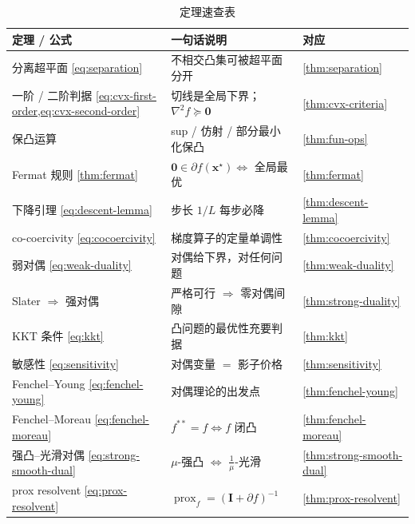 \begin{table}[H]\centering\small
\caption{定理速查表}
\label{tab:cvx-theorems}
\begin{tabular}{lll}
\toprule
定理 / 公式 & 一句话说明 & 对应 \\
\midrule
分离超平面 \cref{eq:separation} & 不相交凸集可被超平面分开 & \cref{thm:separation} \\
一阶 / 二阶判据 \cref{eq:cvx-first-order,eq:cvx-second-order} & 切线是全局下界；$\nabla^2 f\succeq\mathbf 0$ & \cref{thm:cvx-criteria} \\
保凸运算 & sup / 仿射 / 部分最小化保凸 & \cref{thm:fun-ops} \\
Fermat 规则 \cref{thm:fermat} & $\mathbf 0\in\partial f(\mathbf x^\star)\iff$ 全局最优 & \cref{thm:fermat} \\
下降引理 \cref{eq:descent-lemma} & 步长 $1/L$ 每步必降 & \cref{thm:descent-lemma} \\
co-coercivity \cref{eq:cocoercivity} & 梯度算子的定量单调性 & \cref{thm:cocoercivity} \\
弱对偶 \cref{eq:weak-duality} & 对偶给下界，对任何问题 & \cref{thm:weak-duality} \\
Slater $\Rightarrow$ 强对偶 & 严格可行 $\Rightarrow$ 零对偶间隙 & \cref{thm:strong-duality} \\
KKT 条件 \cref{eq:kkt} & 凸问题的最优性充要判据 & \cref{thm:kkt} \\
敏感性 \cref{eq:sensitivity} & 对偶变量 $=$ 影子价格 & \cref{thm:sensitivity} \\
Fenchel--Young \cref{eq:fenchel-young} & 对偶理论的出发点 & \cref{thm:fenchel-young} \\
Fenchel--Moreau \cref{eq:fenchel-moreau} & $f^{\ast\ast}=f\iff f$ 闭凸 & \cref{thm:fenchel-moreau} \\
强凸--光滑对偶 \cref{eq:strong-smooth-dual} & $\mu$-强凸 $\iff$ $\tfrac1\mu$-光滑 & \cref{thm:strong-smooth-dual} \\
prox resolvent \cref{eq:prox-resolvent} & $\operatorname{prox}_f=(\mathbf I+\partial f)^{-1}$ & \cref{thm:prox-resolvent} \\
\bottomrule
\end{tabular}
\end{table}

